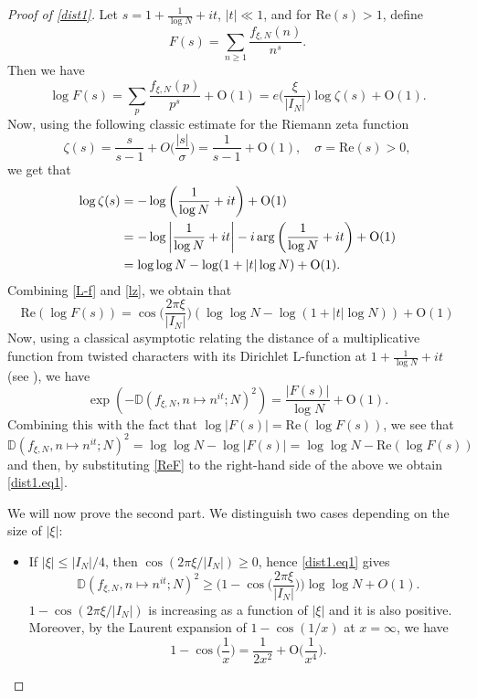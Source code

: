 \documentclass[letter,11pt]{article}
\theoremstyle{plain} %
\theoremstyle{definition} %
\theoremstyle{plain}
\theoremstyle{plain}
\theoremstyle{plain}
\numberwithin{equation}{section}
\newcommand{\Oh}{{\mathrm O}}
\renewcommand{\leq}{\leqslant}
\renewcommand{\geq}{\geqslant}
\renewcommand{\Re}{\mathrm{Re}}
\newcommand{\Dist}{\mathbb{D}}
\newcommand{\1}{\mathbbm{1}}
\newcommand{\f}{f_{\xi,N}}
\begin{document}
\begin{proof}[Proof of \cref{dist1}]
Let $s=1+\frac{1}{\log{N}}+it$, $|t|\ll1$, and for $\Re(s)>1$, define $$F(s)=\sum_{n\geq1}\frac{\f(n)}{n^s}.$$ Then we have
\begin{equation}\label{L-f}
    \log{F(s)}=\sum_{p}\frac{\f(p)}{p^s}+\Oh(1) = e\bigg(\frac{\xi}{|I_N|}\bigg)\log{\zeta(s)} + \Oh(1).
\end{equation}
Now, using the following classic estimate for the Riemann zeta function
$$\zeta(s)=\frac{s}{s-1}+O\bigg(\frac{|s|}{\sigma}\bigg)=\frac{1}{s-1}+\Oh(1),
\quad \sigma=\Re(s)>0,$$
we get that
\begin{align}\label{lz}
    \log{\zeta(s)} & =-\log\bigg(\frac{1}{\log{N}}+it\bigg)+\Oh(1) \\
    & = -\log\bigg|\frac{1}{\log{N}}+it\bigg| -  i\arg\bigg(\frac{1}{\log{N}}+it\bigg)+\Oh(1) \notag \\
    & = \log\log{N} - \log(1+|t|\log{N}) + \Oh(1). \notag
\end{align}
Combining \eqref{L-f} and \eqref{lz}, we obtain that
\begin{equation}\label{ReF}
    \Re(\log{F(s)})
    = \cos\bigg(\frac{2\pi\xi}{|I_N|}\bigg)(\log\log{N}-\log(1+|t|\log{N})) + \Oh(1)
\end{equation}
Now, using a classical asymptotic relating the distance of a multiplicative function from twisted characters with its Dirichlet L-function at $1+\frac{1}{\log{N}}+it$ (see \cite[Eq. (2.2)]{GS_large_char_sums}), we have
$$\exp(-\Dist(\f,n\mapsto n^{it};N)^2)=\frac{|F(s)|}{\log{N}} + \Oh(1).$$ 
Combining this with the fact that $\log|F(s)|=\Re(\log{F(s)})$, we see that
$$\Dist(\f,n\mapsto n^{it};N)^2=\log\log{N}-\log|F(s)|=\log\log{N}-\Re(\log{F(s)})$$ and then, by substituting \eqref{ReF} to the right-hand side of the above we obtain \eqref{dist1.eq1}.
\par
We will now prove the second part. We distinguish two cases depending on the size of $|\xi|$:
\begin{itemize}
    \item If $|\xi|\leq|I_N|/4$, then $\cos(2\pi\xi/|I_N|)\geq0$, hence \eqref{dist1.eq1} gives
    $$\Dist(\f,n\mapsto n^{it};N)^2 \geq \bigg(1-\cos\bigg(\frac{2\pi\xi}{|I_N|}\bigg)\bigg)\log\log{N} + O(1).$$
    $1-\cos(2\pi\xi/|I_N|)$ is increasing as a function of $|\xi|$ and it is also positive. Moreover, by the Laurent expansion of $1-\cos(1/x)$ at $x=\infty$, we have
    \begin{equation}\label{Laurent_exp}
        1-\cos\bigg(\frac{1}{x}\bigg) = \frac{1}{2x^2} + \Oh\bigg(\frac{1}{x^4}\bigg).

\end{equation}
\end{itemize}
\end{proof}
\end{document}
